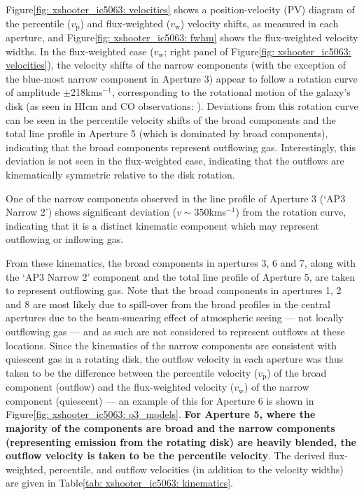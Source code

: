 \newpage
Figure\;\ref{fig: xshooter_ic5063: velocities} shows a position-velocity (PV) diagram of the percentile ($v_\mathrm{p}$) and flux-weighted ($v_\mathrm{w}$) velocity shifts, as measured in each aperture, and Figure\;\ref{fig: xshooter_ic5063: fwhm} shows the flux-weighted velocity widths. In the flux-weighted case ($v_\mathrm{w}$; right panel of Figure\;\ref{fig: xshooter_ic5063: velocities}), the velocity shifts of the narrow components (with the exception of the blue-most narrow component in Aperture 3) appear to follow a rotation curve of amplitude $\pm$218\;km\;s$^{-1}$, corresponding to the rotational motion of the galaxy's disk (as seen in HI\;cm and CO observations: \citealt{Morganti1998, Morganti2015, Oosterloo2017}). Deviations from this rotation curve can be seen in the percentile velocity shifts of the broad components and the total line profile in Aperture 5 (which is dominated by broad components), indicating that the broad components represent outflowing gas. Interestingly, this deviation is not seen in the flux-weighted case, indicating that the outflows are kinematically symmetric relative to the disk rotation. 

One of the narrow components observed in the line profile of Aperture 3 (`AP3 Narrow 2') shows significant deviation ($v\sim350$\;km\;s$^{-1}$) from the rotation curve, indicating that it is a distinct kinematic component which may represent outflowing or inflowing gas. 

From these kinematics, the broad components in apertures 3, 6 and 7, along with the `AP3 Narrow 2' component and the total line profile of Aperture 5, are taken to represent outflowing gas. Note that the broad components in apertures 1, 2 and 8 are most likely due to spill-over from the broad profiles in the central apertures due to the beam-smearing effect of atmospheric seeing --- not locally outflowing gas --- and as such are not considered to represent outflows at these locations. Since the kinematics of the narrow components are consistent with quiescent gas in a rotating disk, the outflow velocity in each aperture was thus taken to be the difference between the percentile velocity ($v_\mathrm{p}$) of the broad component (outflow) and the flux-weighted velocity ($v_\mathrm{w}$) of the narrow component (quiescent) --- an example of this for Aperture 6 is shown in Figure\;\ref{fig: xshooter_ic5063: o3_models}. \textbf{For Aperture 5, where the majority of the components are broad and the narrow components (representing emission from the rotating disk) are heavily blended, the outflow velocity is taken to be the percentile velocity}. The derived flux-weighted, percentile, and outflow velocities (in addition to the velocity widths) are given in Table\;\ref{tab: xshooter_ic5063: kinematics}.

